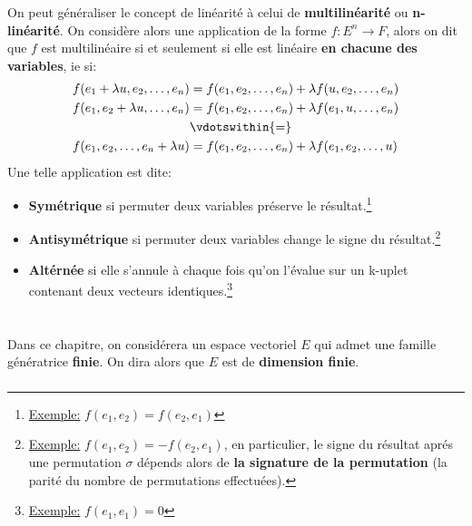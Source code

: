 On peut généraliser le concept de linéarité à celui de \textbf{multilinéarité} ou \textbf{n-linéarité}. On considère alors une application de la forme \(f : E^n \longrightarrow F\), alors on dit que \(f\) est multilinéaire si et seulement si elle est linéaire \textbf{en chacune des variables}, ie si:
\begin{align*}
   f(e_1 + \lambda u, e_2, \ldots, e_n) &= f(e_1, e_2, \ldots, e_n) + \lambda f(u, e_2, \ldots, e_n)  \\
   f(e_1, e_2  + \lambda u, \ldots, e_n) &= f(e_1, e_2, \ldots, e_n) + \lambda f(e_1, u, \ldots, e_n) \\
   & \vdotswithin{=} \\   
   f(e_1, e_2 , \ldots, e_n + \lambda u) &= f(e_1, e_2, \ldots, e_n) + \lambda f(e_1, e_2, \ldots, u)
\end{align*}
Une telle application est dite:
\begin{itemize}
   \item \textbf{Symétrique} si permuter deux variables préserve le résultat.\footnote[1]{\underline{Exemple:} \(f(e_1, e_2) = f(e_2, e_1)\)}
   \item \textbf{Antisymétrique} si permuter deux variables change le signe du résultat.\footnote[2]{\underline{Exemple:} \(f(e_1, e_2) = -f(e_2, e_1)\), en particulier, le signe du résultat aprés une permutation \(\sigma\) dépends alors de \textbf{la signature de la permutation} (la parité du nombre de permutations effectuées).}
   \item  \textbf{Altérnée} si elle s'annule à chaque fois qu'on l'évalue sur un k-uplet contenant deux vecteurs identiques.\footnote[3]{\underline{Exemple:} \(f(e_1, e_1) = 0\)}
\end{itemize}

\chapter*{} %

Dans ce chapitre, on considérera un espace vectoriel \(E\) qui admet une famille génératrice \textbf{finie}. On dira alors que \(E\) est de \textbf{dimension finie}.\<

\subsection*{}

